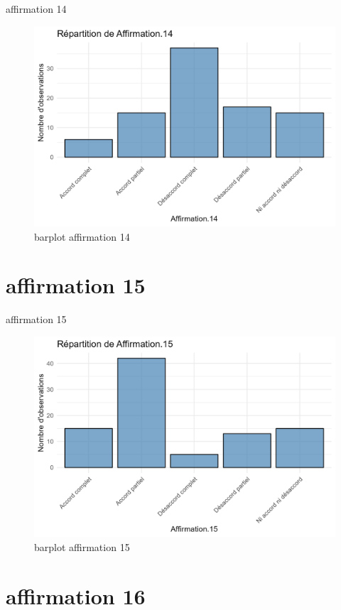 \documentclass[
]{article}
\begin{document}
affirmation 14

\begin{figure}
\centering
\includegraphics{Image/barplot_Affirmation.14.png}
\caption{barplot affirmation 14}
\end{figure}

\section{affirmation 15}\label{affirmation-15}

affirmation 15

\begin{figure}
\centering
\includegraphics{Image/barplot_Affirmation.15.png}
\caption{barplot affirmation 15}
\end{figure}

\section{affirmation 16}\label{affirmation-16}
\end{document}

